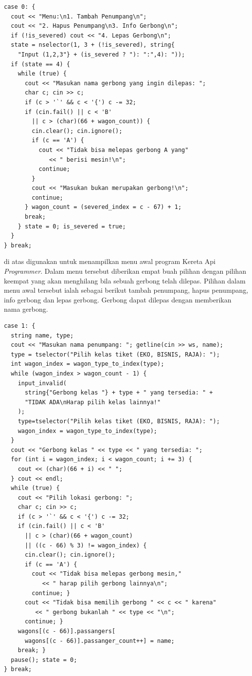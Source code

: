 \documentclass[../main.tex]{subfiles}
\begin{document}
\begin{code}
\begin{verbatim}
case 0: {
  cout << "Menu:\n1. Tambah Penumpang\n";
  cout << "2. Hapus Penumpang\n3. Info Gerbong\n";
  if (!is_severed) cout << "4. Lepas Gerbong\n";
  state = nselector(1, 3 + (!is_severed), string{
    "Input (1,2,3"} + (is_severed ? "): ":",4): "));
  if (state == 4) {
    while (true) {
      cout << "Masukan nama gerbong yang ingin dilepas: ";
      char c; cin >> c;
      if (c > '`' && c < '{') c -= 32;
      if (cin.fail() || c < 'B'
        || c > (char)(66 + wagon_count)) {
        cin.clear(); cin.ignore();
        if (c == 'A') {
          cout << "Tidak bisa melepas gerbong A yang"
             << " berisi mesin!\n";
          continue;
        }
        cout << "Masukan bukan merupakan gerbong!\n";
        continue;
      } wagon_count = (severed_index = c - 67) + 1;
      break;
    } state = 0; is_severed = true;
  }
} break;
\end{verbatim}
\end{code}

{\Script} di atas digunakan untuk menampilkan menu awal program Kereta Api \textit{Programmer}. Dalam menu tersebut diberikan empat buah pilihan dengan pilihan keempat yang akan menghilang bila sebuah gerbong telah dilepas. Pilihan dalam menu awal tersebut ialah sebagai berikut tambah penumpang, hapus penumpang, info gerbong dan lepas gerbong. Gerbong dapat dilepas dengan memberikan nama gerbong.

\begin{code}
\begin{verbatim}
case 1: {
  string name, type;
  cout << "Masukan nama penumpang: "; getline(cin >> ws, name);
  type = tselector("Pilih kelas tiket (EKO, BISNIS, RAJA): ");
  int wagon_index = wagon_type_to_index(type);
  while (wagon_index > wagon_count - 1) {
    input_invalid(
      string{"Gerbong kelas "} + type + " yang tersedia: " +
      "TIDAK ADA\nHarap pilih kelas lainnya!"
    );
    type=tselector("Pilih kelas tiket (EKO, BISNIS, RAJA): ");
    wagon_index = wagon_type_to_index(type);
  }
  cout << "Gerbong kelas " << type << " yang tersedia: ";
  for (int i = wagon_index; i < wagon_count; i += 3) {
    cout << (char)(66 + i) << " ";
  } cout << endl;
  while (true) {
    cout << "Pilih lokasi gerbong: ";
    char c; cin >> c;
    if (c > '`' && c < '{') c -= 32;
    if (cin.fail() || c < 'B'
      || c > (char)(66 + wagon_count)
      || ((c - 66) % 3) != wagon_index) {
      cin.clear(); cin.ignore();
      if (c == 'A') {
        cout << "Tidak bisa melepas gerbong mesin,"
           << " harap pilih gerbong lainnya\n";
        continue; }
      cout << "Tidak bisa memilih gerbong " << c << " karena"
         << " gerbong bukanlah " << type << "\n";
      continue; }
    wagons[(c - 66)].passangers[
      wagons[(c - 66)].passanger_count++] = name;
    break; }
  pause(); state = 0;
} break;
\end{verbatim}
\end{code}
\end{document}
